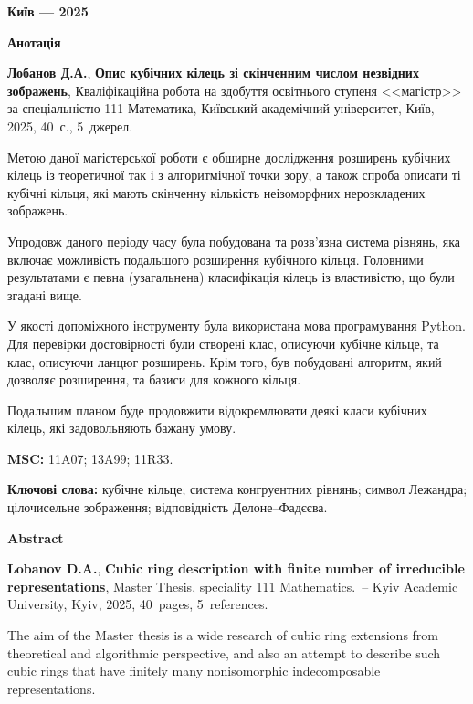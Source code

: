 \documentclass{thesis}
\begin{document}
\vfill

\centerline{\bf Київ --- 2025}

\newpage

\begin{center}
\Large \bf Анотація
\end{center}

\noindent
\textbf{Лобанов Д.А.}, \textbf{Опис кубічних кілець зі скінченним числом незвідних зображень}, Кваліфікаційна робота на здобуття освітнього ступеня <<магістр>> за спеціальністю 111 Математика, Київський академічний університет, Київ, 2025, 40~с., 5~джерел.

\bigskip

Метою даної магістерської роботи є обширне дослідження розширень кубічних кілець із теоретичної так і з алгоритмічної точки зору, а також спроба описати ті кубічні кільця, які мають скінченну кількість неізоморфних нерозкладених зображень.

Упродовж даного періоду часу була побудована та розв'язна система рівнянь, яка включає можливість подальшого розширення кубічного кільця. Головними результатами є певна (узагальнена) класифікація кілець із властивістю, що були згадані вище.

У якості допоміжного інструменту була використана мова програмування Python. Для перевірки достовірності були створені клас, описуючи кубічне кільце, та клас, описуючи ланцюг розширень. Крім того, був побудовані алгоритм, який дозволяє розширення, та базиси для кожного кільця.

Подальшим планом буде продовжити відокремлювати деякі класи кубічних кілець, які задовольняють бажану умову.

\bigskip

\noindent
{\bf MSC:} 11A07; 13A99; 11R33.

\bigskip

\noindent
{\bf Ключові слова:} кубічне кільце; система конгруентних рівнянь; символ Лежандра; цілочисельне зображення; відповідність Делоне--Фадєєва.
\bigskip

\newpage

\begin{center}
\Large \bf Abstract
\end{center}

\noindent
\textbf{Lobanov D.A.}, \textbf{Cubic ring description with finite number of irreducible representations}, Master Thesis, speciality 111 Mathematics.~--
Kyiv Academic University, Kyiv, 2025, 40~pages, 5~references.

\bigskip
The aim of the Master thesis is a wide research of cubic ring extensions from theoretical and algorithmic perspective, and also an attempt to describe such cubic rings that have finitely many nonisomorphic indecomposable representations.
\end{document}
